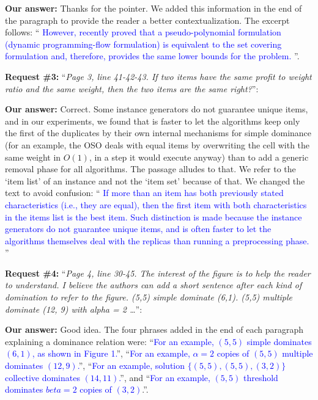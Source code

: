 \documentclass{elsarticle}
\begin{document}
\textbf{Our answer:} Thanks for the pointer. We added this information in the end of the paragraph to provide the reader a better contextualization. The excerpt follows: ``\textcolor{blue}{
However, recently \cite{eq_lb_delorme} proved that a pseudo-polynomial formulation (dynamic programming-flow formulation) is equivalent to the set covering formulation and, therefore, provides the same lower bounds for the problem.
}''.
\medskip

\textbf{Request \#3:} ``\textit{Page 3, line 41-42-43. If two items have the same profit to weight ratio and the same weight, then the two items are the same right?}'':

\textbf{Our answer:} Correct. Some instance generators do not guarantee unique items, and in our experiments, we found that is faster to let the algorithms keep only the first of the duplicates by their own internal mechanisms for simple dominance (for an example, the OSO deals with equal items by overwriting the cell with the same weight in \(O(1)\), in a step it would execute anyway) than to add a generic removal phase for all algorithms.
The passage alludes to that.
We refer to the `item list' of an instance and not the `item set' because of that.
We changed the text to avoid confusion: ``\textcolor{blue}{
If more than an item has both previously stated characteristics (i.e., they are equal), then the first item with both characteristics in the items list is the best item.
Such distinction is made because the instance generators do not guarantee unique items, and is often faster to let the algorithms themselves deal with the replicas than running a preprocessing phase.
}''
\medskip

\textbf{Request \#4:} ``\textit{Page 4, line 30-45. The interest of the figure is to help the reader to understand. I believe the authors can add a short sentence after each kind of domination to refer to the figure. (5,5) simple dominate (6,1). (5,5) multiple dominate (12, 9) with alpha = 2 \dots}'':

\textbf{Our answer:} Good idea. The four phrases added in the end of each paragraph explaining a dominance relation were: ``\textcolor{blue}{For an example, \((5, 5)\) simple dominates \((6, 1)\), as shown in Figure 1.}'', ``\textcolor{blue}{For an example, \(\alpha = 2\) copies of \((5, 5)\) multiple dominates \((12, 9)\).}'', ``\textcolor{blue}{For an example, solution \(\{(5, 5), (5, 5), (3, 2)\}\) collective dominates \((14, 11)\).}'', and ``\textcolor{blue}{For an example, \((5, 5)\) threshold dominates \(beta = 2\) copies of \((3, 2)\)}.''.
\medskip
\end{document}

